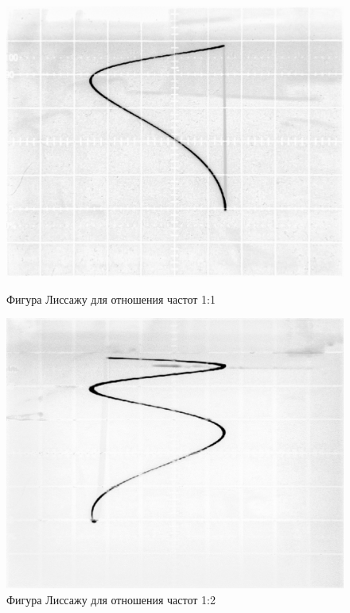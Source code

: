 \documentclass[a4paper,12pt]{article} %
\begin{document}
\begin{figure}[h]
\begin{center}
\begin{minipage}[h]{0.49\textwidth}
\includegraphics[width=\textwidth]{1-1.jpg}
\caption{Фигура Лиссажу для отношения частот 1:1} 
\label{fig:lis11}
\hfill
\end{minipage}
\begin{minipage}[h]{0.49\textwidth}
\includegraphics[width=\textwidth]{1-2.jpg}
\caption{Фигура Лиссажу для отношения частот 1:2}
\label{fig:lis12}
\hfill
\end{minipage}


\end{center}
\end{figure}
\end{document}
